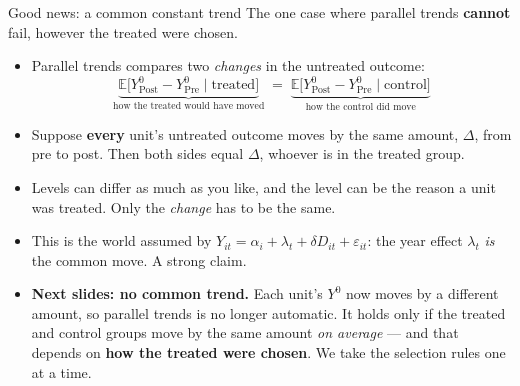 \documentclass[
  11pt,
  ignorenonframetext,
  aspectratio=169,
]{beamer}
\providecommand{\tightlist}{%
  \setlength{\itemsep}{0pt}\setlength{\parskip}{0pt}}
\begin{document}
\begin{frame}{Good news: a common constant trend}
\protect{}\label{good-news-a-common-constant-trend}
The one case where parallel trends \textbf{cannot} fail, however the
treated were chosen.

\begin{itemize}
\tightlist
\item
  Parallel trends compares two \emph{changes} in the untreated outcome:
  \[
  \underbrace{\mathbb{E}\big[Y^0_{\text{Post}} - Y^0_{\text{Pre}} \mid \text{treated}\big]}_{\text{how the treated would have moved}}
  \;=\;
  \underbrace{\mathbb{E}\big[Y^0_{\text{Post}} - Y^0_{\text{Pre}} \mid \text{control}\big]}_{\text{how the control did move}}
  \]
\item
  Suppose \textbf{every} unit's untreated outcome moves by the same
  amount, \(\Delta\), from pre to post. Then both sides equal
  \(\Delta\), whoever is in the treated group.
\item
  Levels can differ as much as you like, and the level can be the reason
  a unit was treated. Only the \emph{change} has to be the same.
\item
  This is the world assumed by
  \(Y_{it} = \alpha_i + \lambda_t + \delta D_{it} + \varepsilon_{it}\):
  the year effect \(\lambda_t\) \emph{is} the common move. A strong
  claim.
\item
  \textbf{Next slides: no common trend.} Each unit's \(Y^0\) now moves
  by a different amount, so parallel trends is no longer automatic. It
  holds only if the treated and control groups move by the same amount
  \emph{on average} --- and that depends on \textbf{how the treated were
  chosen}. We take the selection rules one at a time.
\end{itemize}
\end{frame}
\end{document}
